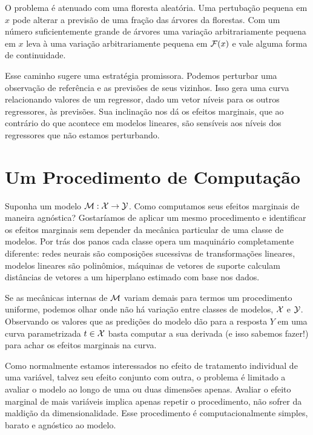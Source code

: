 O problema é atenuado com uma floresta aleatória. Uma pertubação pequena em $x$ pode alterar a previsão de uma fração das árvores da florestas. Com um número suficientemente grande de árvores uma variação arbitrariamente pequena em $x$ leva à uma variação arbitrariamente pequena em $\mathcal{F}(x)$ e vale alguma forma de continuidade. 

Esse caminho sugere uma estratégia promissora. Podemos perturbar uma observação de referência e as previsões de seus vizinhos. Isso gera uma curva relacionando valores de um regressor, dado um vetor níveis para os outros regressores, às previsões. Sua inclinação nos dá os efeitos marginais, que ao contrário do que acontece em modelos lineares, são sensíveis aos níveis dos regressores que não estamos perturbando.

\section{Um Procedimento de Computação}

Suponha um modelo $\mathcal{M} : \mathcal{X} \to \mathcal{Y}$. Como computamos seus efeitos marginais de maneira agnóstica? Gostaríamos de aplicar um mesmo procedimento e identificar os efeitos marginais sem depender da mecânica particular de uma classe de modelos. Por trás dos panos cada classe opera um maquinário completamente diferente: redes neurais são composições sucessivas de transformações lineares, modelos lineares são polinômios, máquinas de vetores de suporte calculam distâncias de vetores a um hiperplano estimado com base nos dados. 

Se as mecânicas internas de $\mathcal{M}$ variam demais para termos um procedimento uniforme, podemos olhar onde não há variação entre classes de modelos, $\mathcal{X}$ e $\mathcal{Y}$. Observando os valores que as predições do modelo dão para a resposta $Y$ em uma curva parametrizada $t \in \mathcal{X}$ basta computar a sua derivada (e isso sabemos fazer!) para achar os efeitos marginais na curva. 

Como normalmente estamos interessados no efeito de tratamento individual de uma variável, talvez seu efeito conjunto com outra, o problema é limitado a avaliar o modelo ao longo de uma ou duas dimensões apenas. Avaliar o efeito marginal de mais variáveis implica apenas repetir o procedimento, não sofrer da maldição da dimensionalidade. Esse procedimento é computacionalmente simples, barato e agnóstico ao modelo.
